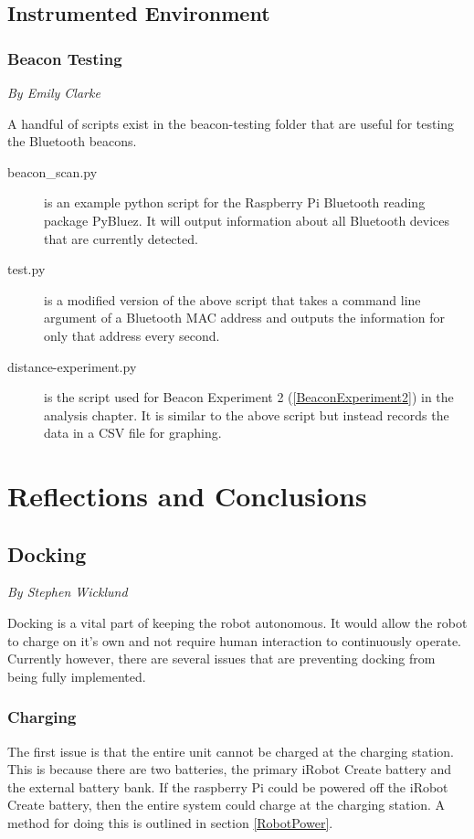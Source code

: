 \documentclass[12pt]{report}
\newcommand{\sectionAuthor}[1]{{\small\vspace{-1em}\textit{#1}}\bigskip\par}
\begin{document}
\section{Instrumented Environment}
\subsection{Beacon Testing}
\sectionAuthor{By Emily Clarke}
A handful of scripts exist in the beacon-testing folder that are useful for testing the Bluetooth beacons.
\begin{description}
    \item[beacon\_scan.py] is an example python script for the Raspberry Pi Bluetooth reading package PyBluez. It will output information about all Bluetooth devices that are currently detected.
    \item[test.py] is a modified version of the above script that takes a command line argument of a Bluetooth MAC address and outputs the information for only that address every second.
    \item[distance-experiment.py] is the script used for Beacon Experiment 2 (\ref{BeaconExperiment2}) in the analysis chapter. It is similar to the above script but instead records the data in a CSV file for graphing.
\end{description}

\chapter{Reflections and Conclusions}
\section{Docking}
\sectionAuthor{By Stephen Wicklund}
Docking is a vital part of keeping the robot autonomous. It would allow the robot to charge on it's own and not require human interaction to continuously operate. Currently however, there are several issues that are preventing docking from being fully implemented.
\subsection{Charging}
The first issue is that the entire unit cannot be charged at the charging station. This is because there are two batteries, the primary iRobot Create battery and the external battery bank. If the raspberry Pi could be powered off the iRobot Create battery, then the entire system could charge at the charging station. A method for doing this is outlined in section \ref{RobotPower}.
\end{document}
